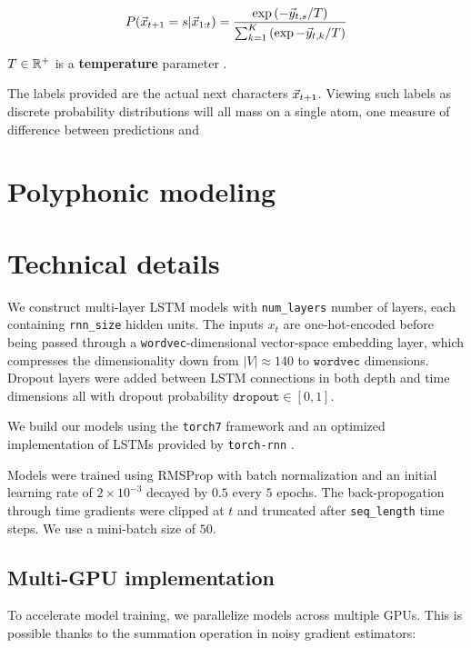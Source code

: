 \documentclass[dissertation.tex]{subfiles}
\begin{document}
\begin{equation}
    \label{eq:boltzmann-dist}
    P(\vec{x}_{t+1} = s | \vec{x}_{1:t})
    = \frac{\exp \left(-\vec{y}_{t,s}/T\right) }{ \sum_{k=1}^{K} \left(\exp -\vec{y}_{t,k}/T\right)}
\end{equation}

$T \in \mathbb{R}^+$ is a \textbf{temperature} parameter .

The labels provided are the actual next characters $\vec{x}_{t+1}$. Viewing
such labels as discrete probability distributions will all mass on a single atom,
one measure of difference between predictions and 

\section{Polyphonic modeling}

\section{Technical details}

We construct multi-layer LSTM models with \texttt{num\_layers} number of
layers, each containing \texttt{rnn\_size} hidden units. The inputs $x_t$ are
one-hot-encoded before being passed through a \texttt{wordvec}-dimensional
vector-space embedding layer, which compresses the dimensionality down from
$|V| \approx 140$ to $\texttt{wordvec}$ dimensions. Dropout layers were added
between LSTM connections in both depth and time dimensions all with dropout
probability $\texttt{dropout} \in [0,1]$.

We build our models using the \texttt{torch7} framework and
an optimized implementation of LSTMs provided by \texttt{torch-rnn} .

Models were trained using RMSProp  with batch normalization 
and an initial learning rate of $2 \times 10^{-3}$ decayed by $0.5$ every $5$
epochs. The back-propogation through time gradients were clipped
at $t$  and truncated after \texttt{seq\_length} time steps.
We use a mini-batch size of $50$.

\subsection{Multi-GPU implementation}

To accelerate model training, we parallelize models across multiple GPUs. This is possible
thanks to the summation operation in noisy gradient estimators:
\end{document}
